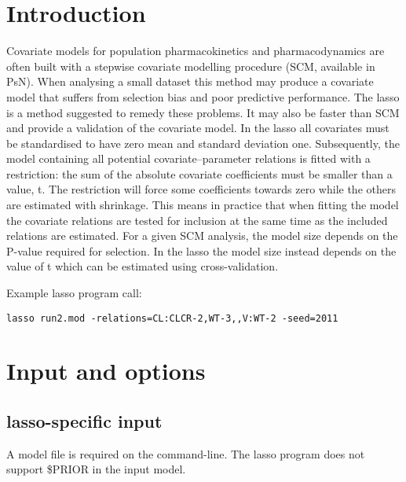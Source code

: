 



\maketitle


\section{Introduction}
Covariate models for population pharmacokinetics and pharmacodynamics are often built with a stepwise covariate modelling procedure (SCM, available in PsN). When analysing a small dataset this method may produce a covariate model that suffers from selection bias and poor predictive performance. The lasso \cite{Ribbing} is a method suggested to remedy these problems. It may also be faster than SCM and provide a validation of the covariate model. In the lasso all covariates must be standardised to have zero mean and standard deviation one. Subsequently, the model containing all potential covariate–parameter relations is fitted with a restriction: the sum of the absolute covariate coefficients must be smaller than a value, t. The restriction will force some coefficients towards zero while the others are estimated with shrinkage. This means in practice that when fitting the model the covariate relations are tested for inclusion at the same time as the included relations are estimated. For a given SCM analysis, the model size depends on the P-value required for selection. In the lasso the model size instead depends on the value of t which can be estimated using cross-validation.

Example lasso program call:
\begin{verbatim}
lasso run2.mod -relations=CL:CLCR-2,WT-3,,V:WT-2 -seed=2011
\end{verbatim}

\section{Input and options}

\subsection{lasso-specific input}
A model file is required on the command-line.
The lasso program does not support \$PRIOR in the input model.

